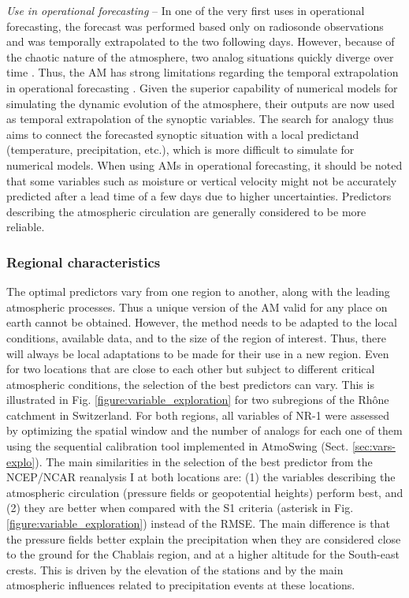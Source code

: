 \documentclass[gmdd]{copernicus}
\begin{document}
\textit{Use in operational forecasting} -- In one of the very first uses in operational forecasting, the forecast was performed based only on radiosonde observations and was temporally extrapolated to the two following days. However, because of the chaotic nature of the atmosphere, two analog situations quickly diverge over time \citep{Lorenz1969}. Thus, the AM has strong limitations regarding the temporal extrapolation in operational forecasting \citep{Bontron2004}. Given the superior capability of numerical models for simulating the dynamic evolution of the atmosphere, their outputs are now used as temporal extrapolation of the synoptic variables. The search for analogy thus aims to connect the forecasted synoptic situation with a local predictand (temperature, precipitation, etc.), which is more difficult to simulate for numerical models. When using AMs in operational forecasting, it should be noted that some variables such as moisture or vertical velocity might not be accurately predicted after a lead time of a few days due to higher uncertainties. Predictors describing the atmospheric circulation are generally considered to be more reliable.


\subsubsection{Regional characteristics}

The optimal predictors vary from one region to another, along with the leading atmospheric processes. Thus a unique version of the AM valid for any place on earth cannot be obtained. However, the method needs to be adapted to the local conditions, available data, and to the size of the region of interest. Thus, there will always be local adaptations to be made for their use in a new region. Even for two locations that are close to each other but subject to different critical atmospheric conditions, the selection of the best predictors can vary. This is illustrated in Fig. \ref{figure:variable_exploration} for two subregions of the Rh\^{o}ne catchment in Switzerland. For both regions, all variables of NR-1 were assessed by optimizing the spatial window and the number of analogs for each one of them using the sequential calibration tool implemented in AtmoSwing (Sect. \ref{sec:vars-explo}). The main similarities in the selection of the best predictor from the NCEP/NCAR reanalysis I at both locations are: (1) the variables describing the atmospheric circulation (pressure fields or geopotential heights) perform best, and (2) they are better when compared with the S1 criteria (asterisk in Fig. \ref{figure:variable_exploration}) instead of the RMSE. The main difference is that the pressure fields better explain the precipitation when they are considered close to the ground for the Chablais region, and at a higher altitude for the South-east crests. This is driven by the elevation of the stations and by the main atmospheric influences related to precipitation events at these locations. 
\end{document}
